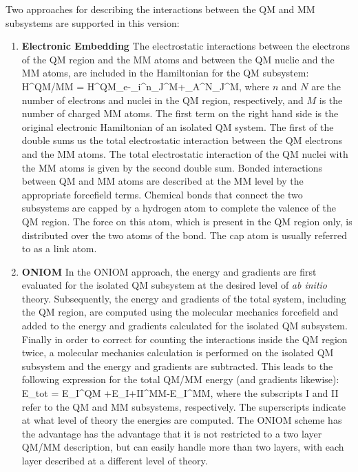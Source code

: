 Two approaches for describing the interactions between the QM and MM
subsystems are supported in this version:

\begin{enumerate}
\item{\textbf{Electronic Embedding}} The electrostatic interactions
between the electrons of the QM region and the MM atoms and between
the QM nuclie and the MM atoms, are included in the Hamiltonian for
the QM subsystem: \beq H^{QM/MM} =
H^{QM}_e-\sum_i^n\sum_J^M+\sum_A^N\sum_J^M,
\eeq where $n$ and $N$ are the number of electrons and nuclei in the
QM region, respectively, and $M$ is the number of charged MM
atoms. The first term on the right hand side is the original
electronic Hamiltonian of an isolated QM system. The first of the
double sums us the total electrostatic interaction between the QM
electrons and the MM atoms. The total electrostatic interaction of the
QM nuclei with the MM atoms is given by the second double sum. Bonded
interactions between QM and MM atoms are described at the MM level by
the appropriate forcefield terms. Chemical bonds that connect the two
subsystems are capped by a hydrogen atom to complete the valence of
the QM region. The force on this atom, which is present in the QM
region only, is distributed over the two atoms of the bond. The cap
atom is usually referred to as a link atom.

\item{\textbf{ONIOM}} In the ONIOM approach, the energy and gradients
are first evaluated for the isolated QM subsystem at the desired level
of {\it{ab initio}} theory. Subsequently, the energy and gradients of
the total system, including the QM region, are computed using the
molecular mechanics forcefield and added to the energy and gradients
calculated for the isolated QM subsystem. Finally in order to correct
for counting the interactions inside the QM region twice, a molecular
mechanics calculation is performed on the isolated QM subsystem and
the energy and gradients are subtracted. This leads to the following
expression for the total QM/MM energy (and gradients likewise): \beq
E_{tot} = E_{I}^{QM}
+E_{I+II}^{MM}-E_{I}^{MM}, \eeq where the
subscripts I and II refer to the QM and MM subsystems,
respectively. The superscripts indicate at what level of theory the
energies are computed. The ONIOM scheme has the advantage has the
advantage that it is not restricted to a two layer QM/MM description,
but can easily handle more than two layers, with each layer described
at a different level of theory.
\end{enumerate}

